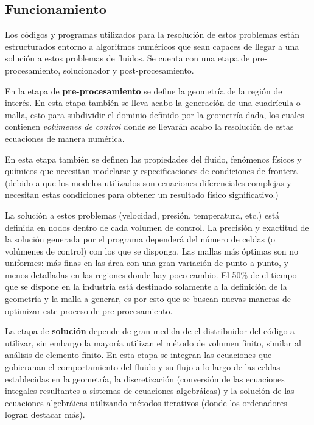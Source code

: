 \documentclass[12pt, letterpaper]{article}
\begin{document}
\subsection*{Funcionamiento}

Los códigos y programas utilizados para la resolución de estos problemas están estructurados entorno a algoritmos numéricos que sean capaces de llegar a una solución a estos problemas de fluidos. Se cuenta con una etapa de pre-procesamiento, solucionador y post-procesamiento.

En la etapa de \textbf{pre-procesamiento} se define la geometría de la región de interés. En esta etapa también se lleva acabo la generación de una cuadrícula o malla, esto para subdividir el dominio definido por la geometría dada, los cuales contienen \textit{volúmenes de control} donde se llevarán acabo la resolución de estas ecuaciones de manera numérica.

En esta etapa también se definen las propiedades del fluido, fenómenos físicos y químicos que necesitan modelarse y especificaciones de condiciones de frontera (debido a que los modelos utilizados son ecuaciones diferenciales complejas y necesitan estas condiciones para obtener un resultado físico significativo.)

La solución a estos problemas (velocidad, presión, temperatura, etc.) está definida en nodos dentro de cada volumen de control. La precisión y exactitud de la solución generada por el programa dependerá del número de celdas (o volúmenes de control) con los que se disponga. Las mallas más óptimas son no uniformes: más finas en las área con una gran variación de punto a punto, y menos detalladas en las regiones donde hay poco cambio. El 50\% de el tiempo que se dispone en la industria está destinado solamente a la definición de la geometría y la malla a generar, es por esto que se buscan nuevas maneras de optimizar este proceso de pre-procesamiento.

La etapa de \textbf{solución} depende de gran medida de el distribuidor del código a utilizar, sin embargo la mayoría utilizan el método de volumen finito, similar al análisis de elemento finito. En esta etapa se integran las ecuaciones que gobieranan el comportamiento del fluido y su flujo a lo largo de las celdas establecidas en la geometría, la discretización (conversión de las ecuaciones integales resultantes a sistemas de ecuaciones algebráicas) y la solución de las ecuaciones algebráicas utilizando métodos iterativos (donde los ordenadores logran destacar más).
\end{document}
